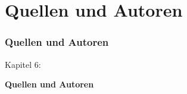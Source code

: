 %

\section{Quellen und Autoren}
\begin{frame}[fragile]
	\frametitle{Quellen und Autoren}

	\begin{center}\huge{Kapitel 6:}\end{center}
	\begin{center}\huge{\color{typo3darkgrey}\textbf{Quellen und Autoren}}\end{center}

\end{frame}


